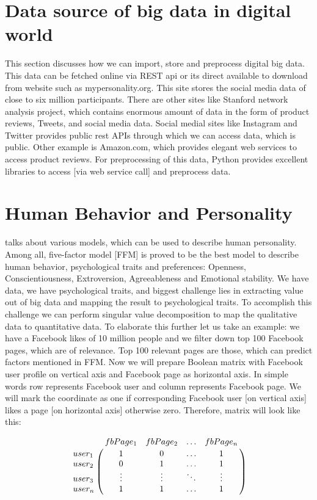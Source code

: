 \documentclass[sigconf]{acmart}
\begin{document}
 
 \section{Data source of big data in digital world}
 
 This section discusses how we can import, store and preprocess digital big data. This data can be fetched online via REST api or its direct available to download from website such as mypersonality.org. This site stores the social media data of close to six million participants. There are other sites like Stanford network analysis project, which contains enormous amount of data in the form of product reviews, Tweets, and social media data. Social medial sites like Instagram and Twitter provides public rest APIs through which we can access data, which is public. Other example is Amazon.com, which provides elegant web services to access product reviews. For preprocessing of this data, Python provides excellent libraries to access [via web service call] and preprocess data. 
 
 \section{Human Behavior and Personality }
\cite{ref11} talks about various models, which can be used to describe human personality. Among all, five-factor model [FFM] is proved to be the best model to describe human behavior, psychological traits and preferences: Openness, Conscientiousness, Extroversion, Agreeableness and Emotional stability. We have data, we have psychological traits, and biggest challenge lies in extracting value out of big data and mapping the result to psychological traits. To accomplish this challenge we can perform singular value decomposition to map the qualitative data to quantitative data. To elaborate this further let us take an example: we have a Facebook likes of 10 million people and we filter down top 100 Facebook pages, which are of relevance. Top 100 relevant pages are those, which can predict factors mentioned in FFM. Now we will prepare Boolean matrix with Facebook user profile on vertical axis and Facebook page as horizontal axis. In simple words row represents Facebook user and column represents Facebook page. We will mark the coordinate as one if corresponding Facebook user [on vertical axis] likes a page [on horizontal axis] otherwise zero. Therefore, matrix will look like this:

$$\bordermatrix{\text{}&fbPage_1 &fbPage_2&\ldots &fbPage_n\cr
                user_1&1 &  0  & \ldots & 1\cr
                user_2& 0  &  1 & \ldots & 1\cr
                user_3& \vdots & \vdots & \ddots & \vdots\cr
                user_n& 1  &   1       &\ldots & 1}$$
\end{document}
